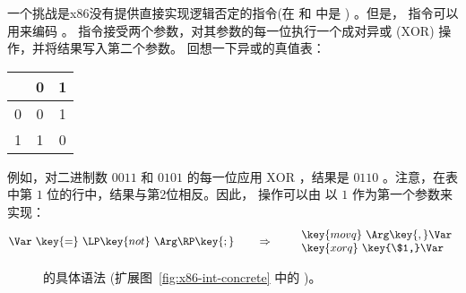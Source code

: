 \documentclass[11pt]{book}
\newcommand{\gray}[1]{{\color{gray} #1}}
\begin{document}
一个挑战是x86没有提供直接实现逻辑否定的指令(在 \LangIf{} 和
\LangCIf{} 中是 ) 。但是，  指令可以用来编码  。  指令接受两个参数，对其参数的每一位执行一个成对异或 ($\mathrm{XOR}$) 操作，并将结果写入第二个参数。
回想一下异或的真值表：
\begin{center}
\begin{tabular}{l|cc}
   & 0 & 1 \\ \hline
0  & 0 & 1 \\
1  & 1 & 0
\end{tabular}
\end{center}
例如，对二进制数
$0011$ 和 $0101$ 的每一位应用 $\mathrm{XOR}$ ，结果是 $0110$ 。注意，在表中第 $1$ 位的行中，结果与第2位相反。因此，  操作可以由  以 $1$ 作为第一个参数来实现：
\[
\Var~ \key{=}~ \LP\key{not}~\Arg\RP\key{;}
\qquad\Rightarrow\qquad
\begin{array}{l}
\key{movq}~ \Arg\key{,} \Var\\
\key{xorq}~ \key{\$1,} \Var
\end{array}
\]


\begin{figure}[tp]
\fbox{
\begin{minipage}{0.96\textwidth}
\[
\begin{array}{lcl}
  \itm{bytereg} &::=& \key{ah} \mid \key{al} \mid \key{bh} \mid \key{bl}
    \mid \key{ch} \mid \key{cl} \mid \key{dh} \mid \key{dl} \\
\Arg &::=& \gray{ \key{\$}\Int \mid \key{\%}\Reg \mid \Int\key{(}\key{\%}\Reg\key{)} } \mid \key{\%}\itm{bytereg}\\
\itm{cc} & ::= & \key{e} \mid \key{l} \mid \key{le} \mid \key{g} \mid \key{ge} \\
\Instr &::=& \gray{ \key{addq} \; \Arg\key{,} \Arg \mid
      \key{subq} \; \Arg\key{,} \Arg \mid
      \key{negq} \; \Arg \mid \key{movq} \; \Arg\key{,} \Arg \mid } \\
  &&  \gray{ \key{callq} \; \itm{label} \mid
      \key{pushq}\;\Arg \mid \key{popq}\;\Arg \mid \key{retq} \mid \key{jmp}\,\itm{label} } \\
  && \gray{ \itm{label}\key{:}\; \Instr }
     \mid \key{xorq}~\Arg\key{,}~\Arg
     \mid \key{cmpq}~\Arg\key{,}~\Arg  \mid \\
  &&  \key{set}cc~\Arg
     \mid \key{movzbq}~\Arg\key{,}~\Arg
     \mid \key{j}cc~\itm{label}
     \\
\LangXIf{} &::= & \gray{ \key{.globl main} }\\
      &    & \gray{ \key{main:} \; \Instr\ldots }
\end{array}
\]
\end{minipage}
}
\caption{\LangXIf{} 的具体语法 (扩展图~\ref{fig:x86-int-concrete} 中的 \LangXInt{} )。}
\label{fig:x86-1-concrete}
\end{figure}
\end{document}
